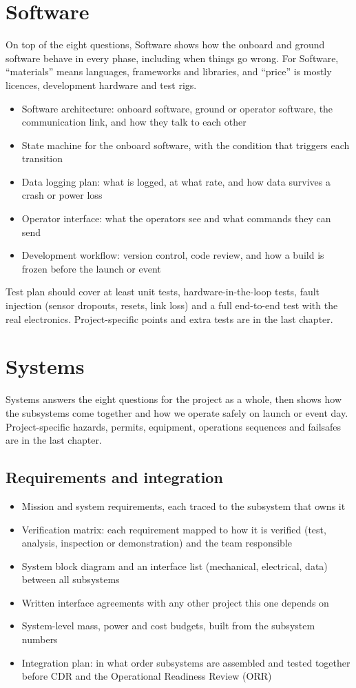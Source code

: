 \documentclass{../../Common/Latex/Templates/rapport}
\renewcommand{\vsection}[1]{\section{#1}}
\renewcommand{\vsubsection}[1]{\subsection{#1}}
\begin{document}
\vsection{Software}
On top of the eight questions, Software shows how the onboard and ground software behave in every phase, including when things go wrong. For Software, ``materials'' means languages, frameworks and libraries, and ``price'' is mostly licences, development hardware and test rigs.
\begin{itemize}
  \item Software architecture: onboard software, ground or operator software, the communication link, and how they talk to each other
  \item State machine for the onboard software, with the condition that triggers each transition
  \item Data logging plan: what is logged, at what rate, and how data survives a crash or power loss
  \item Operator interface: what the operators see and what commands they can send
  \item Development workflow: version control, code review, and how a build is frozen before the launch or event
\end{itemize}
Test plan should cover at least unit tests, hardware-in-the-loop tests, fault injection (sensor dropouts, resets, link loss) and a full end-to-end test with the real electronics. Project-specific points and extra tests are in the last chapter.

\vsection{Systems}
Systems answers the eight questions for the project as a whole, then shows how the subsystems come together and how we operate safely on launch or event day. Project-specific hazards, permits, equipment, operations sequences and failsafes are in the last chapter.

\vsubsection{Requirements and integration}
\begin{itemize}
  \item Mission and system requirements, each traced to the subsystem that owns it
  \item Verification matrix: each requirement mapped to how it is verified (test, analysis, inspection or demonstration) and the team responsible
  \item System block diagram and an interface list (mechanical, electrical, data) between all subsystems
  \item Written interface agreements with any other project this one depends on
  \item System-level mass, power and cost budgets, built from the subsystem numbers
  \item Integration plan: in what order subsystems are assembled and tested together before CDR and the Operational Readiness Review (ORR)
\end{itemize}
\end{document}

